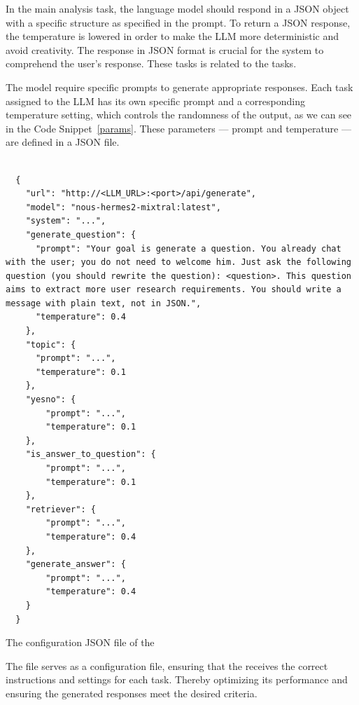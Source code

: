 In the main analysis task, the language model should respond in a JSON object with a specific structure as specified in the prompt. To return a JSON response, the temperature is lowered in order to make the LLM more deterministic and avoid creativity. The response in JSON format is crucial for the system to comprehend the user's response. These tasks is related to the {\nlu} tasks.


The model require specific prompts to generate appropriate responses. Each task assigned to the LLM has its own specific prompt and a corresponding temperature setting, which controls the randomness of the output, as we can see in the Code Snippet~\ref{params}. These parameters — prompt and temperature — are defined in a JSON file. 

\begin{listing}[H]
  \begin{verbatim}
      
  {
    "url": "http://<LLM_URL>:<port>/api/generate",
    "model": "nous-hermes2-mixtral:latest",
    "system": "...",
    "generate_question": {
      "prompt": "Your goal is generate a question. You already chat with the user; you do not need to welcome him. Just ask the following question (you should rewrite the question): <question>. This question aims to extract more user research requirements. You should write a message with plain text, not in JSON.",
      "temperature": 0.4
    },
    "topic": {
      "prompt": "...",
      "temperature": 0.1
    },
    "yesno": {
        "prompt": "...",
        "temperature": 0.1
    },
    "is_answer_to_question": {
        "prompt": "...",
        "temperature": 0.1
    },
    "retriever": {
        "prompt": "...",
        "temperature": 0.4
    },
    "generate_answer": {
        "prompt": "...",
        "temperature": 0.4
    }
  }
  \end{verbatim}
  \caption[The configuration file of the Large Language Model]{The configuration JSON file of the {\llm}}
  \label{params}
\end{listing}

The file serves as a configuration file, ensuring that the {\llm} receives the correct instructions and settings for each task. Thereby optimizing its performance and ensuring the generated responses meet the desired criteria.

